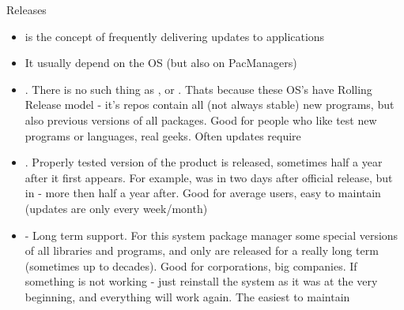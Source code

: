\documentclass[usenames,dvipsnames,10pt,aspectratio=169]{beamer}
\begin{document}

\begin{frame}{Releases}
    \begin{itemize}
        \item {} is the concept of frequently delivering updates to applications
        \item It usually depend on the OS (but also on PacManagers)
        \item {}. There is no such thing as ,  or . Thats because these OS's have Rolling Release model - it's repos contain all (not always stable) new programs, but also previous versions of all packages. Good for people who like test new programs or languages, real geeks. Often updates require
        \item {}. Properly tested version of the product is released, sometimes half a year after it first appears. For example,  was in  two days after official release, but in  - more then half a year after. Good for average users, easy to maintain (updates are only every week/month)
        \item {} - Long term support. For this system package manager  some special versions of all libraries and programs, and only  are released for a really long term (sometimes up to decades). Good for corporations, big companies. If something is not working - just reinstall the system as it was at the very beginning, and everything will work again. The easiest to maintain
    \end{itemize}
\end{frame}
\end{document}
